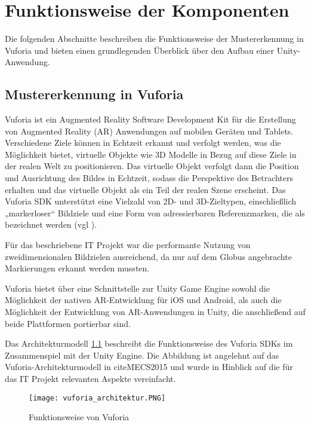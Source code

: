 \chapter{Funktionsweise der Komponenten}\label{ch:funktionsweise_der_komponenten}
Die folgenden Abschnitte beschreiben die Funktionsweise der Mustererkennung in Vuforia und bieten einen grundlegenden Überblick über den Aufbau einer Unity-Anwendung.
\section{Mustererkennung in Vuforia}\label{mustererkennung_vuforia}
Vuforia ist ein Augmented Reality Software Development Kit für die Erstellung von Augmented Reality (AR) Anwendungen auf mobilen Geräten und Tablets.
Verschiedene Ziele können in Echtzeit erkannt und verfolgt werden, was die Möglichkeit bietet, virtuelle Objekte wie 3D Modelle in Bezug auf diese Ziele in der realen Welt zu positionieren.
Das virtuelle Objekt verfolgt dann die Position und Ausrichtung des Bildes in Echtzeit, sodass die Perspektive des Betrachters erhalten und das virtuelle Objekt als ein Teil der realen Szene erscheint.
Das Vuforia SDK unterstützt eine Vielzahl von 2D- und 3D-Zieltypen, einschließlich „markerloser“ Bildziele und eine Form von adressierbaren Referenzmarken, die als  bezeichnet werden (vgl \cite{Vuforia2018}). 

Für das beschriebene IT Projekt war die performante Nutzung von zweidimensionalen Bildzielen ausreichend, da nur auf dem Globus angebrachte Markierungen erkannt werden mussten.

Vuforia bietet über eine Schnittstelle zur Unity Game Engine sowohl die Möglichkeit der nativen AR-Entwicklung für iOS und Android, als auch die Möglichkeit der Entwicklung von AR-Anwendungen in Unity, die anschließend auf beide Plattformen portierbar sind.

Das Architekturmodell \ref{fig:vuforia_architektur} beschreibt die Funktionsweise des Vuforia SDKs im Zusammenspiel mit der Unity Engine. Die Abbildung ist angelehnt auf das Vuforia-Architekturmodell in cite{MECS2015} und wurde in Hinblick auf die für das IT Projekt relevanten Aspekte vereinfacht.

\begin{figure} [h]
\centering
\texttt{[image: vuforia\_architektur.PNG]}
\caption{Funktionsweise von Vuforia}
\label{fig:vuforia_architektur}
\end{figure}
 
